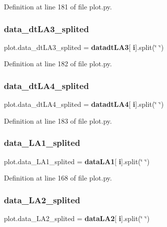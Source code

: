 Definition at line 181 of file plot.\+py.

\mbox{\label{namespaceplot_ab4426cb947f3c118b03f368711159eae}} 
\subsubsection{data\+\_\+dt\+L\+A3\+\_\+splited}
{\footnotesize\ttfamily plot.\+data\+\_\+dt\+L\+A3\+\_\+splited = \textbf{ datadt\+L\+A3}[\textbf{ i}].split(\char`\"{} \char`\"{})}



Definition at line 182 of file plot.\+py.

\mbox{\label{namespaceplot_a4fc985f75931b87fb4126c2589fbda8e}} 
\subsubsection{data\+\_\+dt\+L\+A4\+\_\+splited}
{\footnotesize\ttfamily plot.\+data\+\_\+dt\+L\+A4\+\_\+splited = \textbf{ datadt\+L\+A4}[\textbf{ i}].split(\char`\"{} \char`\"{})}



Definition at line 183 of file plot.\+py.

\mbox{\label{namespaceplot_ab086631e7feb4325da5c3c9b5a8e0277}} 
\subsubsection{data\+\_\+\+L\+A1\+\_\+splited}
{\footnotesize\ttfamily plot.\+data\+\_\+\+L\+A1\+\_\+splited = \textbf{ data\+L\+A1}[\textbf{ i}].split(\char`\"{} \char`\"{})}



Definition at line 168 of file plot.\+py.

\mbox{\label{namespaceplot_a6150b971b754e6053cccb59e3537b054}} 
\subsubsection{data\+\_\+\+L\+A2\+\_\+splited}
{\footnotesize\ttfamily plot.\+data\+\_\+\+L\+A2\+\_\+splited = \textbf{ data\+L\+A2}[\textbf{ i}].split(\char`\"{} \char`\"{})}



